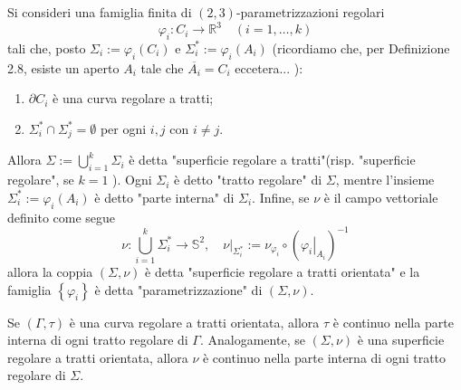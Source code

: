 \begin{boxdef}\label{def: 2.11 SRATO}
    Si consideri una famiglia finita di $(2,3)$-parametrizzazioni regolari
    \[
    \varphi_{i}: C_{i} \rightarrow \mathbb{R}^{3} \quad(i=1, \ldots, k)
    \]
    tali che, posto $\Sigma_{i}:=\varphi_{i}\left(C_{i}\right)$ e $\Sigma_{i}^{*}:=\varphi_{i}\left(A_{i}\right)$ (ricordiamo che, per Definizione 2.8, esiste un aperto $A_{i}$ tale che $\overline{A_{i}}=C_{i}$ eccetera... ):
    
    \begin{enumerate}[label=$\roman*)$]
        \item $\partial C_{i}$ è una curva regolare a tratti;
        \item $\Sigma_{i}^{*} \cap \Sigma_{j}^{*}=\emptyset$ per ogni $i, j$ con $i \neq j$.
    \end{enumerate}
    Allora $\Sigma:=\bigcup_{i=1}^{k} \Sigma_{i}$ è detta "superficie regolare a tratti"(risp. "superficie regolare", se $k=1$ ). Ogni $\Sigma_{i}$ è detto "tratto regolare" di $\Sigma$, mentre l'insieme $\Sigma_{i}^{*}:=\varphi_{i}\left(A_{i}\right)$ è detto "parte interna" di $\Sigma_{i}$. Infine, se $\nu$ è il campo vettoriale definito come segue
    \[
        \nu: \bigcup_{i=1}^{k} \Sigma_{i}^{*} \rightarrow \mathbb{S}^{2},\left.\quad \nu\right|_{\Sigma_{i}^{*}}:=\nu_{\varphi_{i}} \circ\left(\left.\varphi_{i}\right|_{A_{i}}\right)^{-1}
        \]
        allora la coppia $(\Sigma, \nu)$ è detta "superficie regolare a tratti orientata" e la famiglia $\left\{\varphi_{i}\right\}$ è detta "parametrizzazione" di $(\Sigma, \nu)$.
\end{boxdef}

\begin{oss}\label{oss: 2.20}
    Se $(\Gamma, \tau)$ è una curva regolare a tratti orientata, allora $\tau$ è continuo nella parte interna di ogni tratto regolare di $\Gamma$. Analogamente, se $(\Sigma, \nu)$ è una superficie regolare a tratti orientata, allora $\nu$ è continuo nella parte interna di ogni tratto regolare di $\Sigma$.
\end{oss}

